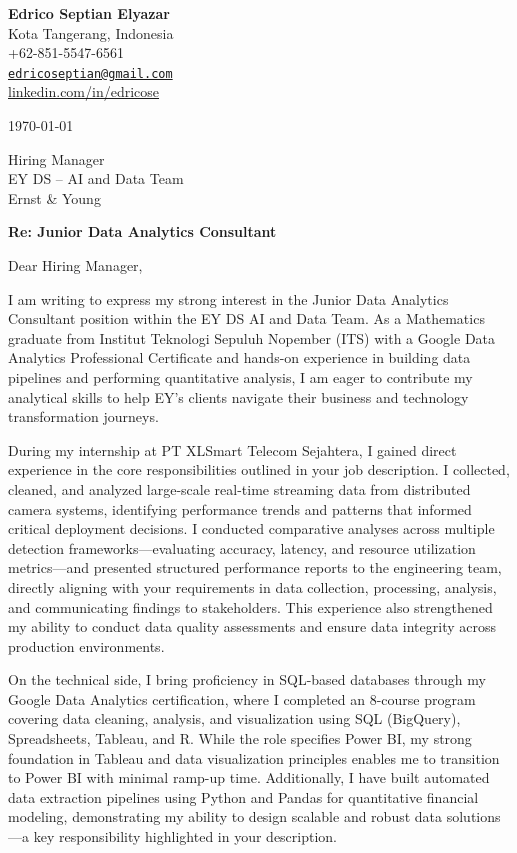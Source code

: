 \documentclass[11pt, letterpaper]{article}
\begin{document}
{\Large \textbf{Edrico Septian Elyazar}} \\[0.3em]
Kota Tangerang, Indonesia \\
+62-851-5547-6561 \\
\href{mailto:edricoseptian@gmail.com}{\nolinkurl{edricoseptian@gmail.com}} \\
\href{https://linkedin.com/in/edricose}{linkedin.com/in/edricose}

\vspace{1em}
\today

\vspace{1em}
Hiring Manager \\
EY DS -- AI and Data Team \\
Ernst \& Young

\vspace{0.5em}
\textbf{Re: Junior Data Analytics Consultant}

Dear Hiring Manager,

I am writing to express my strong interest in the Junior Data Analytics Consultant position within the EY DS AI and Data Team. As a Mathematics graduate from Institut Teknologi Sepuluh Nopember (ITS) with a Google Data Analytics Professional Certificate and hands-on experience in building data pipelines and performing quantitative analysis, I am eager to contribute my analytical skills to help EY's clients navigate their business and technology transformation journeys.

During my internship at PT XLSmart Telecom Sejahtera, I gained direct experience in the core responsibilities outlined in your job description. I collected, cleaned, and analyzed large-scale real-time streaming data from distributed camera systems, identifying performance trends and patterns that informed critical deployment decisions. I conducted comparative analyses across multiple detection frameworks---evaluating accuracy, latency, and resource utilization metrics---and presented structured performance reports to the engineering team, directly aligning with your requirements in data collection, processing, analysis, and communicating findings to stakeholders. This experience also strengthened my ability to conduct data quality assessments and ensure data integrity across production environments.

On the technical side, I bring proficiency in SQL-based databases through my Google Data Analytics certification, where I completed an 8-course program covering data cleaning, analysis, and visualization using SQL (BigQuery), Spreadsheets, Tableau, and R. While the role specifies Power BI, my strong foundation in Tableau and data visualization principles enables me to transition to Power BI with minimal ramp-up time. Additionally, I have built automated data extraction pipelines using Python and Pandas for quantitative financial modeling, demonstrating my ability to design scalable and robust data solutions---a key responsibility highlighted in your description.
\end{document}
